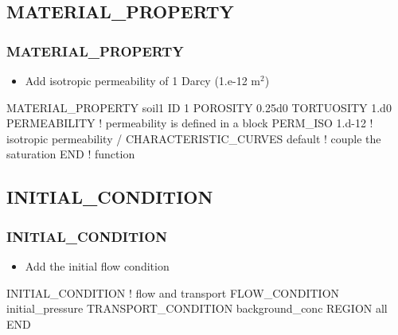 \documentclass{beamer}
\newcommand\bluecomment[1]{{{\color{blue} #1}}}
\newcommand\greencomment[1]{{{\color{green} #1}}}
\newcommand\magentacomment[1]{{{\color{magenta} #1}}}
\begin{document}
\subsection{MATERIAL\_PROPERTY}

\begin{frame}[fragile]\frametitle{MATERIAL\_PROPERTY}

\begin{itemize}
\item Add isotropic permeability of 1 Darcy (1.e-12 m$^2$)
\end{itemize}

\begin{semiverbatim}
MATERIAL_PROPERTY soil1
  ID 1
  POROSITY 0.25d0
  TORTUOSITY 1.d0
  \magentacomment{PERMEABILITY}     \bluecomment{! permeability is defined in a block}
    \magentacomment{PERM_ISO 1.d-12}  \bluecomment{! isotropic permeability}
  \magentacomment{/}
  \magentacomment{CHARACTERISTIC_CURVES default}  \bluecomment{! couple the saturation}
END                              \bluecomment{!   function}
\end{semiverbatim}

\end{frame}

\subsection{INITIAL\_CONDITION}

\begin{frame}[fragile]\frametitle{INITIAL\_CONDITION}

\begin{itemize}
\item Add the \greencomment{initial} flow condition
\end{itemize}

\begin{semiverbatim}

INITIAL_CONDITION              \bluecomment{! flow and transport}
  \magentacomment{FLOW_CONDITION initial_pressure}
  TRANSPORT_CONDITION background_conc
  REGION all
END

\end{semiverbatim}

\end{frame}

\end{document}
